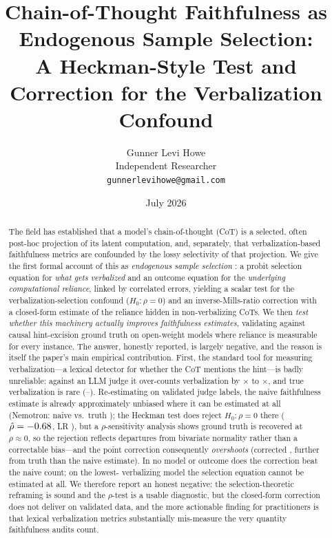 \documentclass[10pt]{article}
\title{Chain-of-Thought Faithfulness as Endogenous Sample Selection:\\
A Heckman-Style Test and Correction for the Verbalization Confound}
\author{Gunner Levi Howe\\
Independent Researcher\\
\texttt{gunnerlevihowe@gmail.com}}
\date{July 2026}
\begin{document}
\maketitle

\begin{abstract}
The field has established that a model's chain-of-thought (CoT) is a
selected, often post-hoc projection of its latent computation, and,
separately, that verbalization-based faithfulness metrics are confounded by
the lossy selectivity of that projection. We give the first formal account
of this as \emph{endogenous sample selection} \citep{heckman1979}: a probit
selection equation for \emph{what gets verbalized} and an outcome equation
for the \emph{underlying computational reliance}, linked by correlated
errors, yielding a scalar test for the verbalization-selection confound
($H_0\!:\rho=0$) and an inverse-Mills-ratio correction with a closed-form
estimate of the reliance hidden in non-verbalizing CoTs. We then \emph{test
whether this machinery actually improves faithfulness estimates}, validating
against causal hint-excision ground truth on open-weight models where reliance
is measurable for every instance. The answer, honestly reported, is largely
negative, and the reason is itself the paper's main empirical contribution.
First, the standard tool for measuring verbalization---a lexical detector for
whether the CoT mentions the hint---is badly unreliable: against an LLM judge
it over-counts verbalization by \QNeOvercount$\times$ to \QQwOvercount$\times$,
and true verbalization is rare (\QQwJudgeRate--\QNeJudgeRate). Re-estimating on
validated judge labels, the naive faithfulness estimate is already
approximately unbiased where it can be estimated at all
(Nemotron: naive \QQNaiveSel{} vs.\ truth \QQTruePop{}); the Heckman test does
reject $H_0\!:\rho=0$ there ($\hat\rho=-0.68$, LR \QrhoLRpMain), but a
$\rho$-sensitivity analysis shows ground truth is recovered at $\rho\approx0$,
so the rejection reflects departures from bivariate normality rather than a
correctable bias---and the point correction consequently \emph{overshoots}
(corrected \QQCorrPop{}, further from truth than the naive estimate). In no
model or outcome does the correction beat the naive count; on the lowest-%
verbalizing model the selection equation cannot be estimated at all. We
therefore report an honest negative: the selection-theoretic reframing is
sound and the $\rho$-test is a usable diagnostic, but the closed-form
correction does not deliver on validated data, and the more actionable finding
for practitioners is that lexical verbalization metrics substantially
mis-measure the very quantity faithfulness audits count.
\end{abstract}
\end{document}
